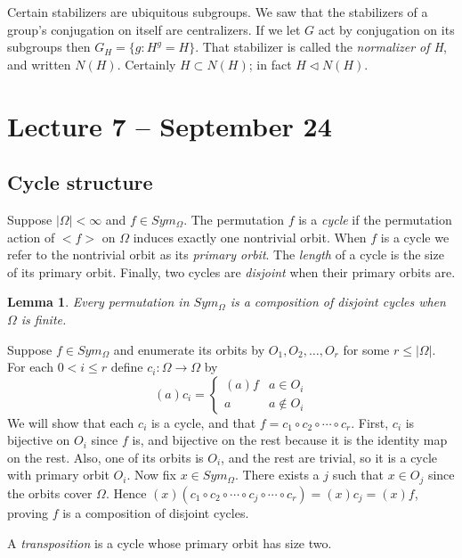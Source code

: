 \documentclass[letterpaper]{article}
\newtheorem{lemma}[theorem]{Lemma}
\newenvironment{proof}[1][Proof]{\begin{trivlist}
\item[\hskip \labelsep {\bfseries #1}]}{\end{trivlist}}
\begin{document}
Certain stabilizers are ubiquitous subgroups. We saw that the stabilizers of a group's conjugation on itself are centralizers. If we let $G$ act by conjugation on its subgroups then $G_H = \{g\colon H^g = H\}$. That stabilizer is called the \emph{normalizer of H}, and written $N(H)$. Certainly $H \subset N(H)$; in fact $H \lhd N(H)$.

\section{Lecture 7 -- September 24}

\subsection{Cycle structure}

Suppose $|\Omega| < \infty$ and $f \in Sym_\Omega$. The permutation $f$ is a \emph{cycle} if the permutation action of ${<}f{>}$ on $\Omega$ induces exactly one nontrivial orbit. When $f$ is a cycle we refer to the nontrivial orbit as its \emph{primary orbit}. The \emph{length} of a cycle is the size of its primary orbit. Finally, two cycles are \emph{disjoint} when their primary orbits are.

\begin{lemma}
Every permutation in $Sym_\Omega$ is a composition of disjoint cycles when $\Omega$ is finite.
\end{lemma}
\begin{proof}
Suppose $f \in Sym_\Omega$ and enumerate its orbits by $O_1, O_2, \ldots, O_r$ for some $r \leq |\Omega|$. For each $0 < i \leq r$ define $c_i \colon \Omega \rightarrow \Omega$ by
\[(a)c_i = \begin{cases}
(a)f & a \in O_i \\
a & a \not \in O_i
\end{cases}
\]
We will show that each $c_i$ is a cycle, and that $f = c_1 \circ c_2 \circ \cdots \circ c_r$. First, $c_i$ is bijective on $O_i$ since $f$ is, and bijective on the rest because it is the identity map on the rest. Also, one of its orbits is $O_i$, and the rest are trivial, so it is a cycle with primary orbit $O_i$. Now fix $x \in Sym_\Omega$. There exists a $j$ such that $x \in O_j$ since the orbits cover $\Omega$. Hence $(x)(c_1 \circ c_2 \circ \cdots \circ c_j \circ \cdots \circ c_r) = (x)c_j = (x)f$, proving $f$ is a composition of disjoint cycles.
\end{proof}

A \emph{transposition} is a cycle whose primary orbit has size two.
\end{document}
